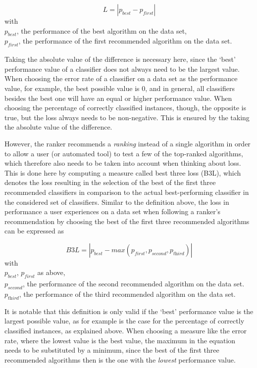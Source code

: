$$L=|p_{\textit{best}}-p_{\textit{first}}|$$
with \\
$p_{\textit{best}}$, the performance of the best algorithm on the data set, \\
$p_{\textit{first}}$, the  performance of the first recommended algorithm on the data set.

Taking the absolute value of the difference is necessary here, since the `best' performance value of a classifier does not always need to be the largest value. When choosing the error rate of a classifier on a data set as the performance value, for example, the best possible value is 0, and in general, all classifiers besides the best one will have an equal or higher performance value. When choosing the percentage of correctly classified instances, though, the opposite is true, but the loss always needs to be non-negative. This is ensured by the taking the absolute value of the difference.

However, the ranker recommends a \textit{ranking} instead of a single algorithm in order to allow a user (or automated tool) to test a few of the top-ranked algorithms, which therefore also needs to be taken into account when thinking about loss. This is done here by computing a measure called best three loss (B3L), which denotes the loss resulting in the selection of the best of the first three recommended classifiers in comparison to the actual best-performing classifier in the considered set of classifiers. Similar to the definition above, the loss in performance a user experiences on a data set when following a ranker's recommendation by choosing the best of the first three recommended algorithms can be expressed as

$$\textit{B3L}=|p_{\textit{best}}-\textit{max}(p_{\textit{first}}, p_{\textit{second}}, p_{\textit{third}})|$$
with \\
$p_{\textit{best}}$, $p_{\textit{first}}$ as above, \\
$p_{\textit{second}}$, the performance of the second recommended algorithm on the data set. \\
$p_{\textit{third}}$, the performance of the third recommended algorithm on the data set.

It is notable that this definition is only valid if the `best' performance value is the largest possible value, as for example is the case for the percentage of correctly classified instances, as explained above. When choosing a measure like the error rate, where the lowest value is the best value, the maximum in the equation needs to be substituted by a minimum, since the best of the first three recommended algorithms then is the one with the \textit{lowest} performance value.

